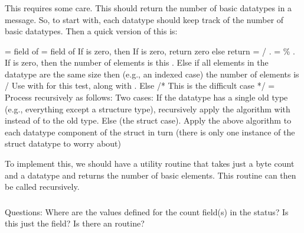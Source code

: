 \documentclass{article}
\begin{document}
\subsubsection{}
This requires some care.  This should return the number of basic datatypes in
a message.  So, to start with, each datatype should keep track of the number
of basic datatypes.  Then a quick version of this is:
\begin{algorithm}
 =  field of 
         =  field of 
If  is zero, then
    If  is zero, return zero
    else return 
 =  / .  
   =  \% .
If  is zero, then 
    the number of elements is this 
    . 
Else if all elements in the datatype are the same size then
    (e.g., an indexed case)
    the number of elements is  /
    Use  with
     for this test, along
    with .
Else 
    /* This is the difficult case */
     = 
    Process  recursively as follows:
    Two cases:
    If the datatype has a single old type (e.g., everything except 
    a structure type), recursively apply the algorithm with  
    instead of  to the old type.
    Else 
       (the struct case).
       Apply the above algorithm to each datatype component of the
       struct in turn (there is only one instance of the struct
       datatype to worry about)
\end{algorithm}
\noindent
To implement this, we should have a utility routine
 that takes just a byte count and a
datatype and returns the number of basic elements.  This routine can
then be called recursively.

\subsubsection{}
Questions: Where are the values defined for the count field(s) in the status?
Is this just the  field?  Is there an
 routine?
\end{document}
